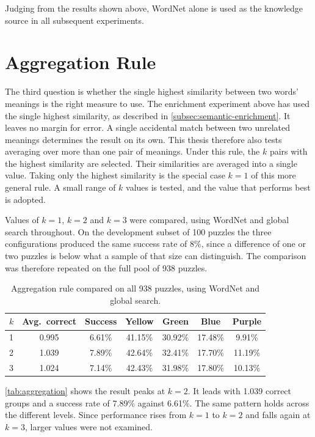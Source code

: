 Judging from the results shown above, WordNet alone is used as the knowledge source in all subsequent experiments.

\section{Aggregation Rule}
\label{sec:exp-aggregation}

The third question is whether the single highest similarity between two words' meanings is the right measure to use. The enrichment experiment above has used the single highest similarity, as described in \autoref{subsec:semantic-enrichment}. It leaves no margin for error. A single accidental match between two unrelated meanings determines the result on its own. This thesis therefore also tests averaging over more than one pair of meanings. Under this rule, the $k$ pairs with the highest similarity are selected. Their similarities are averaged into a single value. Taking only the highest similarity is the special case $k = 1$ of this more general rule. A small range of $k$ values is tested, and the value that performs best is adopted.

Values of $k = 1$, $k = 2$ and $k = 3$ were compared, using WordNet and global search throughout. On the development subset of 100 puzzles the three configurations produced the same success rate of 8\%, since a difference of one or two puzzles is below what a sample of that size can distinguish. The comparison was therefore repeated on the full pool of 938 puzzles.

\begin{table}[t]
\centering
\caption{Aggregation rule compared on all 938 puzzles, using WordNet and global search.}
\label{tab:aggregation}
\begin{tabular}{lcccccc}
\toprule
$k$ & Avg.\ correct & Success & Yellow & Green & Blue & Purple \\
\midrule
1 & 0.995 & 6.61\% & 41.15\% & 30.92\% & 17.48\% & 9.91\% \\
2 & 1.039 & 7.89\% & 42.64\% & 32.41\% & 17.70\% & 11.19\% \\
3 & 1.024 & 7.14\% & 42.43\% & 31.98\% & 17.80\% & 10.13\% \\
\bottomrule
\end{tabular}
\end{table}

\autoref{tab:aggregation} shows the result peaks at $k = 2$. It leads with 1.039 correct groups and a success rate of 7.89\% against 6.61\%. The same pattern holds across the different levels. Since performance rises from $k = 1$ to $k = 2$ and falls again at $k = 3$, larger values were not examined.

